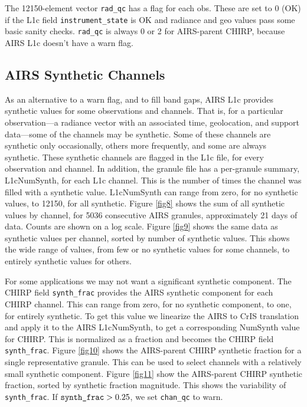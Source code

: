 \documentclass[11pt]{article}
\begin{document}
The 12150-element vector \texttt{rad\_qc} has a flag for each obs.
These are set to 0 (OK) if the L1c field \texttt{instrument\_state}
is OK and radiance and geo values pass some basic sanity checks.
\texttt{rad\_qc} is always 0 or 2 for AIRS-parent CHIRP, because
AIRS L1c doesn't have a warn flag.

\subsection{AIRS Synthetic Channels}

As an alternative to a warn flag, and to fill band gaps, AIRS L1c
provides synthetic values for some observations and channels.  That
is, for a particular observation---a radiance vector with an
associated time, geolocation, and support data---some of the
channels may be synthetic.  Some of these channels are synthetic
only occasionally, others more frequently, and some are always
synthetic.  These synthetic channels are flagged in the L1c file,
for every observation and channel.  In addition, the granule file
has a per-granule summary, L1cNumSynth, for each L1c channel.  This
is the number of times the channel was filled with a synthetic
value.  L1cNumSynth can range from zero, for no synthetic values, to
12150, for all synthetic.  Figure \ref{fig8} shows the sum of all
synthetic values by channel, for 5036 consecutive AIRS granules,
approximately 21 days of data.  Counts are shown on a log scale.
Figure \ref{fig9} shows the same data as synthetic values per
channel, sorted by number of synthetic values.  This shows the wide
range of values, from few or no synthetic values for some channels,
to entirely synthetic values for others.

For some applications we may not want a significant synthetic
component.  The CHIRP field \texttt{synth\_frac} provides the AIRS
synthetic component for each CHIRP channel.  This can range from
zero, for no synthetic component, to one, for entirely synthetic.
To get this value we linearize the AIRS to CrIS translation and
apply it to the AIRS L1cNumSynth, to get a corresponding NumSynth
value for CHIRP.  This is normalized as a fraction and becomes the
CHIRP field \texttt{synth\_frac}.  Figure \ref{fig10} shows the
AIRS-parent CHIRP synthetic fraction for a single representative
granule. This can be used to select channels with a relatively small
synthetic component.  Figure \ref{fig11} show the AIRS-parent CHIRP
synthetic fraction, sorted by synthetic fraction magnitude.  This
shows the variability of \texttt{synth\_frac}.  If
$\hbox{\texttt{synth\_frac}} > 0.25$, we set \texttt{chan\_qc} to
warn.
\end{document}
